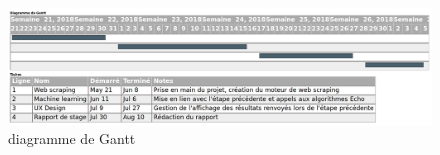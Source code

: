 \documentclass[12pt]{article}
\begin{document}
\begin{appendices}
\

\newpage
\begin{figure}[p]
	\centering
	\includegraphics[scale=0.3]{gantt.png}
	\caption{diagramme de Gantt}
\end{figure}

\end{appendices}
\end{document}
